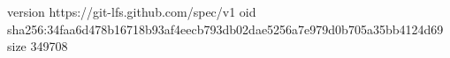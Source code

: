 version https://git-lfs.github.com/spec/v1
oid sha256:34faa6d478b16718b93af4eecb793db02dae5256a7e979d0b705a35bb4124d69
size 349708
